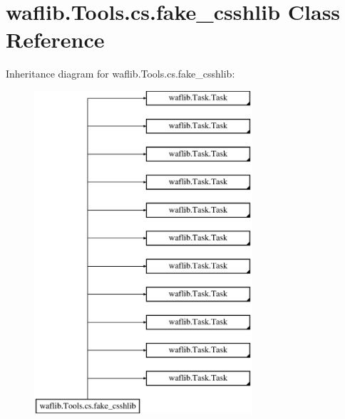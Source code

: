 \hypertarget{classwaflib_1_1_tools_1_1cs_1_1fake__csshlib}{}\section{waflib.\+Tools.\+cs.\+fake\+\_\+csshlib Class Reference}
\label{classwaflib_1_1_tools_1_1cs_1_1fake__csshlib}
Inheritance diagram for waflib.\+Tools.\+cs.\+fake\+\_\+csshlib\+:\begin{figure}[H]
\begin{center}
\leavevmode
\includegraphics[height=12.000000cm]{classwaflib_1_1_tools_1_1cs_1_1fake__csshlib}
\end{center}
\end{figure}
